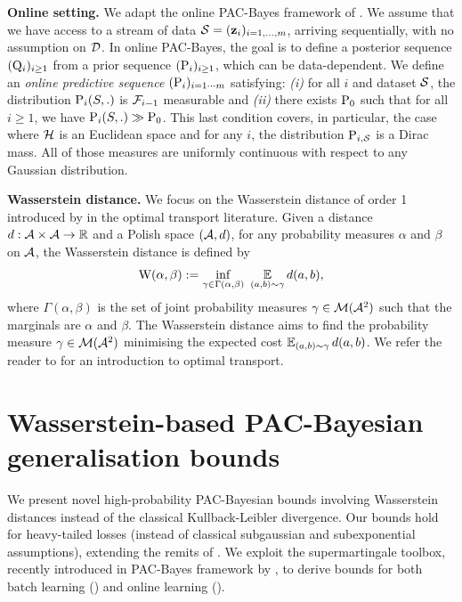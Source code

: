 \textbf{Online setting.} 
We adapt the online PAC-Bayes framework of \cite{haddouche2022online}.
We assume that we have access to a stream of data $\S=(\z_i)_{i=1,\dots,m}$, arriving sequentially, with no assumption on $\Dcal$.
In online PAC-Bayes, the goal is to define a posterior sequence $(\Q_i)_{i\geq 1}$ from a prior sequence $(\P_i)_{i\geq 1}$, which can be data-dependent.
We define an \emph{online predictive sequence} $(\P_i)_{i=1\cdots m}$ satisfying: {\it (i)} for all $i$ and dataset $\S$, the distribution $\P_i(S,.)$ is $\Fcal_{i-1}$ measurable and {\it (ii)} there exists $\P_0$ such that for all $i \geq 1$, we have $\P_i(S,.)\gg \P_{0}$. 
This last condition covers, in particular, the case where $\H$ is an Euclidean space and for any $i$, the distribution $\P_{i,\S}$ is a Dirac mass. 
All of those measures are uniformly continuous with respect to any Gaussian distribution. 

\textbf{Wasserstein distance.}
We focus on the Wasserstein distance of order 1 introduced by \cite{kantorovich1960mathematical} in the optimal transport literature. 
Given a distance $d: \Acal\times\Acal \to \Rbb$ and a Polish space $(\Acal, d)$, for any probability measures $\alpha$ and $\beta$ on $\Acal$, the Wasserstein distance is defined by
\begin{align}
\W(\alpha, \beta) \defeq \inf_{\gamma\in \Gamma(\alpha, \beta)}\
\EE_{(a, b)\sim\gamma}d(a, b),\label{eq:wasserstein}
\end{align}
where $\Gamma(\alpha, \beta)$ is the set of joint probability measures $\gamma \in \Mcal(\Acal^2)$ such that the marginals are $\alpha$ and $\beta$.
The Wasserstein distance aims to find the probability measure $\gamma\in\Mcal(\Acal^2)$ minimising the expected cost $\EE_{(a, b)\sim\gamma}d(a, b)$.
We refer the reader to \cite{villani2009optimal,peyre2019computational} for an introduction to optimal transport.

\section{Wasserstein-based PAC-Bayesian generalisation bounds}
\label{sec:wasserstein}

We present novel high-probability PAC-Bayesian bounds involving Wasserstein distances instead of the classical Kullback-Leibler divergence. 
Our bounds hold for heavy-tailed losses (instead of classical subgaussian and subexponential assumptions), extending the remits of \cite[Theorem 11]{amit2022integral}.
We exploit the supermartingale toolbox, recently introduced in PAC-Bayes framework by \cite{haddouche2023pac,chugg2023unified,jang2023tighter}, to derive bounds for both batch learning () and online learning ().


